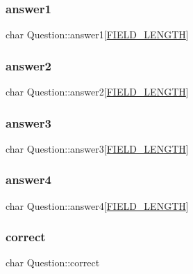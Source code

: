 \subsubsection{\texorpdfstring{answer1}{answer1}}
{\footnotesize\ttfamily char Question\+::answer1\mbox{[}\mbox{\hyperlink{mydb_8h_a4e8ecaf2d59499a8c159ccdf7be1baec}{F\+I\+E\+L\+D\+\_\+\+L\+E\+N\+G\+TH}}\mbox{]}}

\mbox{\label{structQuestion_a1a6f4a873b32609a0475d3a2902d1215}} 
\subsubsection{\texorpdfstring{answer2}{answer2}}
{\footnotesize\ttfamily char Question\+::answer2\mbox{[}\mbox{\hyperlink{mydb_8h_a4e8ecaf2d59499a8c159ccdf7be1baec}{F\+I\+E\+L\+D\+\_\+\+L\+E\+N\+G\+TH}}\mbox{]}}

\mbox{\label{structQuestion_a3ab3e9b12d5358ab16a493747647161d}} 
\subsubsection{\texorpdfstring{answer3}{answer3}}
{\footnotesize\ttfamily char Question\+::answer3\mbox{[}\mbox{\hyperlink{mydb_8h_a4e8ecaf2d59499a8c159ccdf7be1baec}{F\+I\+E\+L\+D\+\_\+\+L\+E\+N\+G\+TH}}\mbox{]}}

\mbox{\label{structQuestion_a7966046ed86d5959a74a8aab9554d168}} 
\subsubsection{\texorpdfstring{answer4}{answer4}}
{\footnotesize\ttfamily char Question\+::answer4\mbox{[}\mbox{\hyperlink{mydb_8h_a4e8ecaf2d59499a8c159ccdf7be1baec}{F\+I\+E\+L\+D\+\_\+\+L\+E\+N\+G\+TH}}\mbox{]}}

\mbox{\label{structQuestion_a5ad88ad3b7a9b7763dd81d92b754ac1d}} 
\subsubsection{\texorpdfstring{correct}{correct}}
{\footnotesize\ttfamily char Question\+::correct}

